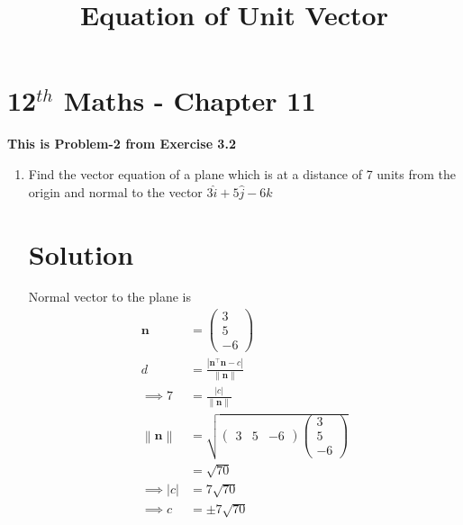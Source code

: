 \documentclass[12pt]{article}
\providecommand{\norm}[1]{\left\lVert#1\right\rVert}
\newcommand{\myvec}[1]{\ensuremath{\begin{pmatrix}#1\end{pmatrix}}}
\providecommand{\abs}[1]{\left\vert#1\right\vert}
\let\vec\mathbf
\begin{document}
\begin{center}
\title{\textbf{Equation  of Unit Vector}}
\date{\vspace{-5ex}} %
\maketitle
\end{center}
\setcounter{page}{1}
\section{12$^{th}$ Maths - Chapter 11}
\textbf{This is Problem-2 from Exercise 3.2}
\begin{enumerate}
\item Find the vector equation of a plane which is at a distance of 7 units from the origin and normal to the vector $3\hat{i}+5\hat{j}-6\hat{k}$
\section{Solution}
Normal vector to the plane is
\begin{align} 
\vec{n}&=\myvec{3\\5\\-6}\\
d&=\frac{\abs{\vec{n}^\top\vec{n}-c}}{\norm{\vec{n}}}\\
\implies7&=\frac{\abs{c}}{\norm{\vec{n}}}\\
\norm{\vec{n}}&=\sqrt{\myvec{3& 5& -6}\myvec{3\\5\\-6}}\\
&=\sqrt{70}\\
\implies\abs{c}&=7\sqrt{70}\\
\implies c &=\pm7\sqrt{70}
\end{align}	  
\end{enumerate} 
\end{document}
